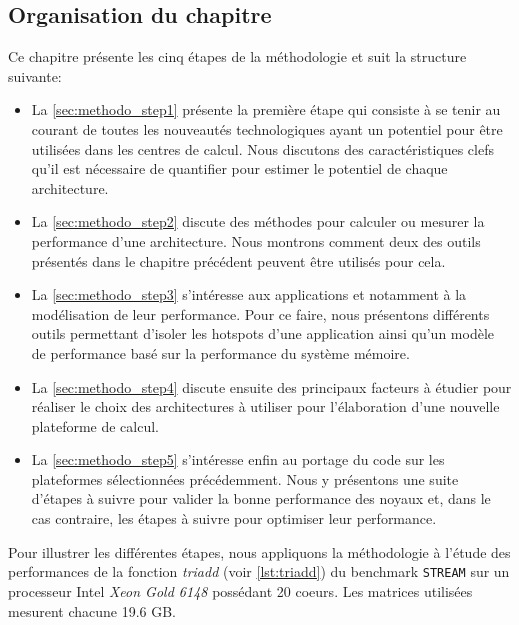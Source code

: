      
        
        
\subsection{Organisation du chapitre}



    Ce chapitre présente les cinq étapes de la méthodologie et suit la structure suivante:
    \begin{itemize}
        \item La \autoref{sec:methodo_step1} présente la première étape qui consiste à se tenir au courant de toutes les nouveautés technologiques ayant un potentiel pour être utilisées dans les centres de calcul. Nous discutons des caractéristiques clefs qu'il est nécessaire de quantifier pour estimer le potentiel de chaque architecture.
        \item La \autoref{sec:methodo_step2} discute des méthodes pour calculer ou mesurer la performance d'une architecture. Nous montrons comment deux des outils présentés dans le chapitre précédent peuvent être utilisés pour cela.
        \item La \autoref{sec:methodo_step3} s'intéresse aux applications et notamment à la modélisation de leur performance. Pour ce faire, nous présentons différents outils permettant d'isoler les \glspl{hotspot} d'une application ainsi qu'un modèle de performance basé sur la performance du système mémoire.
        \item La \autoref{sec:methodo_step4} discute ensuite des principaux facteurs à étudier pour réaliser le choix des architectures à utiliser pour l'élaboration d'une nouvelle plateforme de calcul. 
        \item La \autoref{sec:methodo_step5} s'intéresse enfin au portage du code sur les plateformes sélectionnées précédemment. Nous y présentons une suite d'étapes à suivre pour valider la bonne performance des noyaux et, dans le cas contraire, les étapes à suivre pour optimiser leur performance.
    \end{itemize}
    
    Pour illustrer les différentes étapes, nous appliquons la méthodologie à l'étude des performances de la fonction \textit{triadd} (voir \autoref{lst:triadd}) du benchmark \verb|STREAM| \cite{McCalpin1995} sur un processeur Intel\textit{ Xeon Gold 6148} possédant 20 coeurs. Les matrices utilisées mesurent chacune 19.6 GB.\\
    
